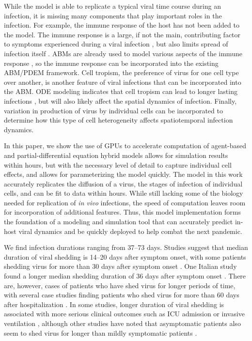 While the model is able to replicate a typical viral time course during an infection, it is missing many components that play important roles in the infection. For example, the immune response of the host has not been added to the model. The immune response is a large, if not the main, contributing factor to symptoms experienced during a viral infection \cite{manchanda14,zheng18}, but also limits spread of infection itself \cite{dobrovolny13}. ABMs are already used to model various aspects of the immune response \cite{whitman20,kerepesi19,levin16}, so the immune response can be incorporated into the existing ABM/PDEM framework. Cell tropism, the preference of virus for one cell type over another, is another feature of viral infections that can be incorporated into the ABM. ODE modeling indicates that cell tropism can lead to longer lasting infections \cite{dobrovolny10}, but will also likely affect the spatial dynamics of infection. Finally, variation in production of virus by individual cells \cite{timm12} can be incorporated to determine how this type of cell heterogeneity affects spatiotemporal infection dynamics.

In this paper, we show the use of GPUs to accelerate computation of agent-based and partial-differential equation hybrid models allows for simulation results within hours, but with the necessary level of detail to capture individual cell effects, and allows for parameterizing the model quickly. The model in this work accurately replicates the diffusion of a virus, the stages of infection of individual cells, and can be fit to data within hours. While still lacking some of the biology needed for replication of \emph{in vivo} infections, the speed of computation leaves room for incorporation of additional features. Thus, this model implementation forms the foundation of a modeling and simulation tool that can accurately predict in-host viral dynamics and be quickly deployed to help combat the next pandemic.

We find infection durations ranging from 37--73 days. Studies suggest that median duration of viral shedding is 14--20 days after symptom onset, with some patients shedding virus for more than 30 days after symptom onset \cite{qi20, he20shed, zhou20, lee20}. One Italian study found a longer median shedding duration of 36 days after symptom onset \cite{mancuso20}. There are, however, cases of patients who have shed virus for longer periods of time, with several case studies finding patients who shed virus for more than 60 days after hospitalization \cite{park20, liu20, li20shed}. In some studies, longer duration of viral shedding is associated with more serious clinical outcomes such as ICU admission or invasive ventilation \cite{zeng20, lee20}, although other studies have noted that asymptomatic patients also seem to shed virus for longer than mildly symptomatic patients \cite{long20}.

